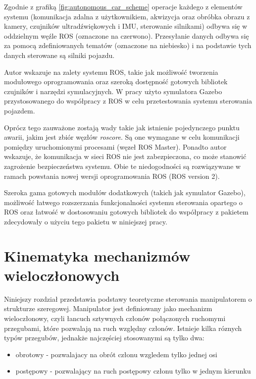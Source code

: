 \documentclass[a4paper, 12pt, twoside]{article}
\begin{document}
\begin{itemize}
Zgodnie z grafiką \ref{fig:autonomous_car_scheme} operacje każdego z elementów systemu (komunikacja zdalna z użytkownikiem, akwizycja oraz obróbka obrazu z kamery, czujników ultradźwiękowych i IMU, sterowanie silnikami) odbywa się w oddzielnym węźle ROS (oznaczone na czerwono). Przesyłanie danych odbywa się za pomocą zdefiniowanych tematów (oznaczone na niebiesko) i na podstawie tych danych sterowane są silniki pojazdu.

Autor wskazuje na zalety systemu ROS, takie jak możliwość tworzenia modułowego oprogramowania oraz szeroką dostępność gotowych bibliotek czujników i narzędzi symulacyjnych. W pracy użyto symulatora Gazebo przystosowanego do współpracy z ROS w celu przetestowania systemu sterowania pojazdem. 

Oprócz tego zauważone zostają wady takie jak istnienie pojedynczego punktu awarii, jakim jest zbiór węzłów \textit{roscore}. Są one wymagane w celu komunikacji pomiędzy uruchomionymi procesami (węzeł ROS Master). Ponadto autor wskazuje, że komunikacja w sieci ROS nie jest zabezpieczona, co może stanowić zagrożenie bezpieczeństwa systemu. Obie te niedogodności są rozwiązywane w ramach powstania nowej wersji oprogramowania ROS (ROS version 2).

\end{itemize}

Szeroka gama gotowych modułów dodatkowych (takich jak symulator Gazebo), możliwość łatwego rozszerzania funkcjonalności systemu sterowania opartego o ROS oraz łatwość w dostosowaniu gotowych bibliotek do współpracy z pakietem zdecydowały o użyciu tego pakietu w niniejszej pracy. 

\newpage
\vspace*{1.5 cm}
\section{Kinematyka mechanizmów wieloczłonowych}
\vspace{1.5 cm}
Niniejszy rozdział przedstawia podstawy teoretyczne sterowania manipulatorem o strukturze szeregowej. Manipulator jest definiowany jako mechanizm wieloczłonowy, czyli łancuch sztywnych członów połączonych ruchomymi przegubami, które pozwalają na ruch względny członów. Istnieje kilka róznych typów przegubów, jednakże najczęściej stosowanymi są tylko dwa:

\begin{itemize}
\item obrotowy - pozwalajacy na obrót członu wzgledem tylko jednej osi
\item postępowy - pozwalający na ruch postępowy członu tylko w jednym kierunku
\end{itemize}
\end{document}
